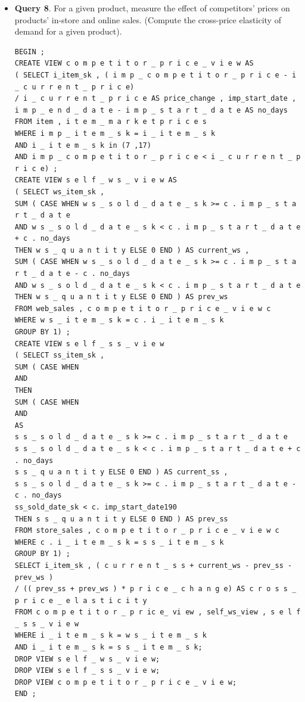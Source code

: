 \documentclass[12pt]{book}
\begin{document}
\begin{itemize}
\item \textbf{Query 8}. For a given product, measure the effect of competitors’ prices on products’ in-store and online sales. 
(Compute the cross-price elasticity of demand for a given product).
\begin{lstlisting}[frame=single]
BEGIN ;
CREATE VIEW c o m p e t i t o r _ p r i c e _ v i e w AS
( SELECT i_item_sk , ( i m p _ c o m p e t i t o r _ p r i c e - i _ c u r r e n t _ p r i c e)
/ i _ c u r r e n t _ p r i c e AS price_change , imp_start_date ,
i m p _ e n d _ d a t e - i m p _ s t a r t _ d a t e AS no_days
FROM item , i t e m _ m a r k e t p r i c e s
WHERE i m p _ i t e m _ s k = i _ i t e m _ s k
AND i _ i t e m _ s k in (7 ,17)
AND i m p _ c o m p e t i t o r _ p r i c e < i _ c u r r e n t _ p r i c e) ;
CREATE VIEW s e l f _ w s _ v i e w AS
( SELECT ws_item_sk ,
SUM ( CASE WHEN w s _ s o l d _ d a t e _ s k >= c . i m p _ s t a r t _ d a t e
AND w s _ s o l d _ d a t e _ s k < c . i m p _ s t a r t _ d a t e + c . no_days
THEN w s _ q u a n t i t y ELSE 0 END ) AS current_ws ,
SUM ( CASE WHEN w s _ s o l d _ d a t e _ s k >= c . i m p _ s t a r t _ d a t e - c . no_days
AND w s _ s o l d _ d a t e _ s k < c . i m p _ s t a r t _ d a t e
THEN w s _ q u a n t i t y ELSE 0 END ) AS prev_ws
FROM web_sales , c o m p e t i t o r _ p r i c e _ v i e w c
WHERE w s _ i t e m _ s k = c . i _ i t e m _ s k
GROUP BY 1) ;
CREATE VIEW s e l f _ s s _ v i e w
( SELECT ss_item_sk ,
SUM ( CASE WHEN
AND
THEN
SUM ( CASE WHEN
AND
AS
s s _ s o l d _ d a t e _ s k >= c . i m p _ s t a r t _ d a t e
s s _ s o l d _ d a t e _ s k < c . i m p _ s t a r t _ d a t e + c . no_days
s s _ q u a n t i t y ELSE 0 END ) AS current_ss ,
s s _ s o l d _ d a t e _ s k >= c . i m p _ s t a r t _ d a t e - c . no_days
ss_sold_date_sk < c. imp_start_date190
THEN s s _ q u a n t i t y ELSE 0 END ) AS prev_ss
FROM store_sales , c o m p e t i t o r _ p r i c e _ v i e w c
WHERE c . i _ i t e m _ s k = s s _ i t e m _ s k
GROUP BY 1) ;
SELECT i_item_sk , ( c u r r e n t _ s s + current_ws - prev_ss - prev_ws )
/ (( prev_ss + prev_ws ) * p r i c e _ c h a n g e) AS c r o s s _ p r i c e _ e l a s t i c i t y
FROM c o m p e t i t o r _ p r ic e_ vi ew , self_ws_view , s e l f _ s s _ v i e w
WHERE i _ i t e m _ s k = w s _ i t e m _ s k
AND i _ i t e m _ s k = s s _ i t e m _ s k;
DROP VIEW s e l f _ w s _ v i e w;
DROP VIEW s e l f _ s s _ v i e w;
DROP VIEW c o m p e t i t o r _ p r i c e _ v i e w;
END ;
\end{lstlisting}


\end{itemize}
\end{document}
